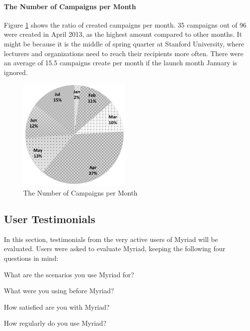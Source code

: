 \clearpage

\paragraph{The Number of Campaigns per Month} Figure \ref{fig:ChartCampaignsMonths} shows the ratio of created campaigns per month. 35 campaigns out of 96 were created in April 2013, as the highest amount compared to other months. It might be because it is the middle of spring quarter at Stanford University, where lecturers and organizations need to reach their recipients more often. There were an average of 15.5 campaigns create per month if the launch month January is ignored.

\begin{figure}[htbp]
	\centering
	\includegraphics[width=0.50\textwidth]{imgs/ChartCampaignsMonths.png}
	\caption[The Number of Campaigns per Month]{The Number of Campaigns per Month}
	\label{fig:ChartCampaignsMonths}
\end{figure}

\subsection{User Testimonials}
\label{subsec:5.4.2:UserTest}

In this section, testimonials from the very active users of Myriad will be evaluated. Users were asked to evaluate Myriad, keeping the following four questions in mind:

\begin{compactenum}
	\item What are the scenarios you use Myriad for?
	\item What were you using before Myriad?
	\item How satisfied are you with Myriad?
	\item How regularly do you use Myriad?
\end{compactenum}

